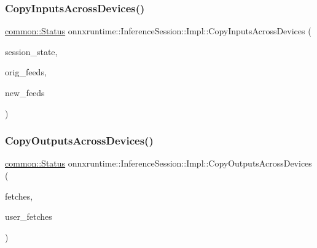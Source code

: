 \mbox{\label{classonnxruntime_1_1InferenceSession_1_1Impl_ac681c08b076eb5cc3a97424b147e6a92}} 
\subsubsection{\texorpdfstring{Copy\+Inputs\+Across\+Devices()}{CopyInputsAcrossDevices()}}
{\footnotesize\ttfamily \mbox{\hyperlink{classonnxruntime_1_1common_1_1Status}{common\+::\+Status}} onnxruntime\+::\+Inference\+Session\+::\+Impl\+::\+Copy\+Inputs\+Across\+Devices (\begin{DoxyParamCaption}\item[{const \mbox{\hyperlink{classonnxruntime_1_1SessionState}{Session\+State}} \&}]{session\+\_\+state,  }\item[{const \mbox{\hyperlink{namespaceonnxruntime_a48b01f0410ec8d693dbd40d1132bd66c}{Name\+M\+L\+Val\+Map}} \&}]{orig\+\_\+feeds,  }\item[{\mbox{\hyperlink{namespaceonnxruntime_a48b01f0410ec8d693dbd40d1132bd66c}{Name\+M\+L\+Val\+Map}} \&}]{new\+\_\+feeds }\end{DoxyParamCaption})\hspace{0.3cm}{\ttfamily [inline]}}

\mbox{\label{classonnxruntime_1_1InferenceSession_1_1Impl_a186dd29be61d0703146263d87f1271f1}} 
\subsubsection{\texorpdfstring{Copy\+Outputs\+Across\+Devices()}{CopyOutputsAcrossDevices()}}
{\footnotesize\ttfamily \mbox{\hyperlink{classonnxruntime_1_1common_1_1Status}{common\+::\+Status}} onnxruntime\+::\+Inference\+Session\+::\+Impl\+::\+Copy\+Outputs\+Across\+Devices (\begin{DoxyParamCaption}\item[{std\+::vector$<$ \mbox{\hyperlink{classonnxruntime_1_1MLValue}{M\+L\+Value}} $>$ \&}]{fetches,  }\item[{std\+::vector$<$ \mbox{\hyperlink{classonnxruntime_1_1MLValue}{M\+L\+Value}} $>$ \&}]{user\+\_\+fetches }\end{DoxyParamCaption})\hspace{0.3cm}{\ttfamily [inline]}}

